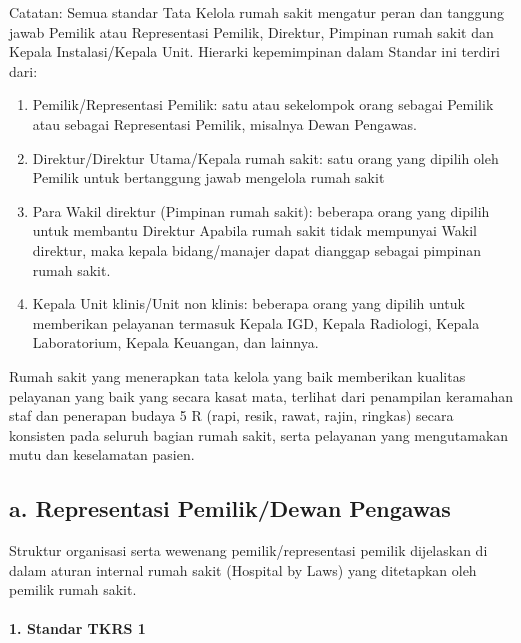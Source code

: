 \documentclass[
]{book}
\providecommand{\tightlist}{%
  \setlength{\itemsep}{0pt}\setlength{\parskip}{0pt}}
\begin{document}
Catatan: Semua standar Tata Kelola rumah sakit mengatur peran dan tanggung jawab Pemilik atau Representasi Pemilik, Direktur, Pimpinan rumah sakit dan Kepala Instalasi/Kepala Unit. Hierarki kepemimpinan dalam Standar ini terdiri dari:

\begin{enumerate}
\def\labelenumi{\alph{enumi}.}
\tightlist
\item
  Pemilik/Representasi Pemilik: satu atau sekelompok orang sebagai Pemilik atau sebagai Representasi Pemilik, misalnya Dewan Pengawas.
\item
  Direktur/Direktur Utama/Kepala rumah sakit: satu orang yang dipilih oleh Pemilik untuk bertanggung jawab mengelola rumah sakit
\item
  Para Wakil direktur (Pimpinan rumah sakit): beberapa orang yang dipilih untuk membantu Direktur Apabila rumah sakit tidak mempunyai Wakil direktur, maka kepala bidang/manajer dapat dianggap sebagai pimpinan rumah sakit.
\item
  Kepala Unit klinis/Unit non klinis: beberapa orang yang dipilih untuk memberikan pelayanan termasuk Kepala IGD, Kepala Radiologi, Kepala Laboratorium, Kepala Keuangan, dan lainnya.
\end{enumerate}

Rumah sakit yang menerapkan tata kelola yang baik memberikan kualitas pelayanan yang baik yang secara kasat mata, terlihat dari penampilan keramahan staf dan penerapan budaya 5 R (rapi, resik, rawat, rajin, ringkas) secara konsisten pada seluruh bagian rumah sakit, serta pelayanan yang mengutamakan mutu dan keselamatan pasien.

\hypertarget{a.-representasi-pemilikdewan-pengawas}{%
\subsection*{a. Representasi Pemilik/Dewan Pengawas}\label{a.-representasi-pemilikdewan-pengawas}}

Struktur organisasi serta wewenang pemilik/representasi pemilik dijelaskan di dalam aturan internal rumah sakit (Hospital by Laws) yang ditetapkan oleh pemilik rumah sakit.

\hypertarget{standar-tkrs-1}{%
\paragraph*{1. Standar TKRS 1}\label{standar-tkrs-1}}
\end{document}
